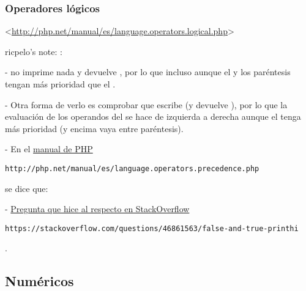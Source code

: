 \documentclass[a4paper,11pt,spanish]{sphinxmanual}
\begin{document}
\subsubsection{Operadores lógicos}
\label{\detokenize{php:operadores-logicos}}
\textless{}\url{http://php.net/manual/es/language.operators.logical.php}\textgreater{}

\begin{DUlineblock}{0em}
\item[] ricpelo's note: :
\item[] -  no imprime nada y devuelve
, por lo que  incluso aunque el \sphinxcode{\&\&} y los paréntesis tengan
más prioridad que el .
\item[] - Otra forma de verlo es comprobar que
 escribe  (y devuelve
), por lo que la evaluación de los operandos del  se
hace de izquierda a derecha aunque el \sphinxcode{+} tenga más prioridad (y
encima vaya entre paréntesis).
\item[] - En el \href{http://php.net/manual/es/language.operators.precedence.php}{manual de
PHP}%
\begin{footnote}[1]\sphinxAtStartFootnote
\nolinkurl{http://php.net/manual/es/language.operators.precedence.php}
%
\end{footnote} se
dice que: 
\item[] - \href{https://stackoverflow.com/questions/46861563/false-and-true-printhi}{Pregunta que hice al respecto en
StackOverflow}%
\begin{footnote}[2]\sphinxAtStartFootnote
\nolinkurl{https://stackoverflow.com/questions/46861563/false-and-true-printhi}
%
\end{footnote}.
\end{DUlineblock}


\subsection{Numéricos}
\label{\detokenize{php:numericos}}
\end{document}
